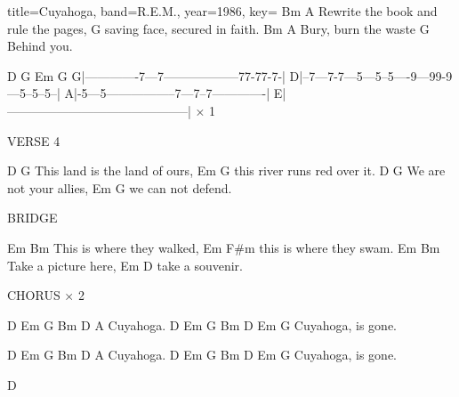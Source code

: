 \documentclass{skrul-leadsheet}
\begin{document}
\begin{song}[transpose-capo=true]{title={Cuyahoga}, band={R.E.M.}, year={1986}, key={}}
  Bm                A
Rewrite the book and rule the pages,
G
saving face, secured in faith.
Bm             A
Bury, burn the waste
G
Behind you.
 
   D          G          Em          G
G|-------------7---7------------------77-77-7-|
D|--7---7-7---5---5--5----9---99-9---5--5--5--|
A|-5---5-----------------7---7--7-------------|
E|--------------------------------------------| × 1
 
VERSE 4
 
     D                   G
This land is the land of ours,
     Em             G
this river runs red over it.
D               G
We are not your allies,
Em         G
we can not defend.
 
BRIDGE
 
Em                 Bm
This is where they walked,
Em                 F#m
this is where they swam.
Em                  Bm
Take a picture here,
Em               D
take a souvenir.
 
CHORUS × 2
 
D   Em  G Bm     D      A
    Cuyahoga.
D   Em  G Bm     D  Em  G
    Cuyahoga, is gone.
 
D   Em  G Bm     D      A
    Cuyahoga.
D   Em  G Bm     D  Em  G
    Cuyahoga, is gone.
 
D

\end{song}
\end{document}
